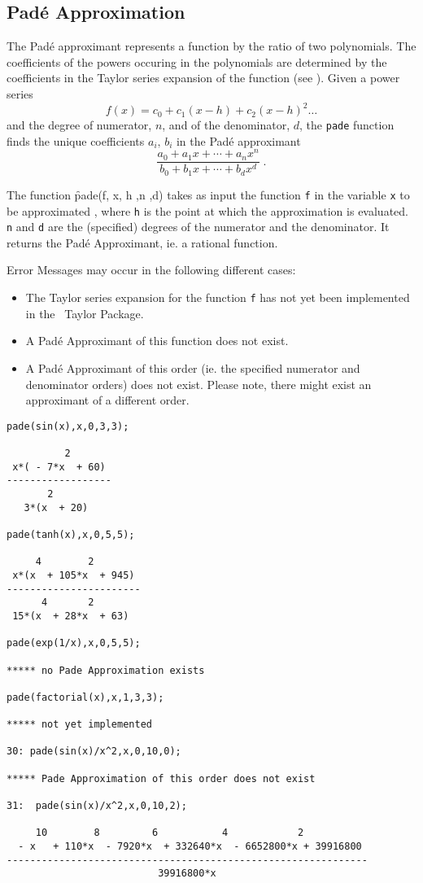 \subsection{Pad\'{e} Approximation}

The Pad\'{e} approximant represents a function by the ratio of two 
polynomials. The coefficients of the powers occuring in the polynomials 
are determined by the coefficients in the Taylor series
expansion of the function (see \cite{Baker:81a}). Given a power series
\[ f(x) = c_0 + c_1 (x-h) + c_2 (x-h)^2 \ldots \]
and the degree of numerator, $n$, and of the denominator, $d$,
the {\tt pade} function finds the unique coefficients 
$a_i,\, b_i$ in the Pad\'{e} approximant 
\[ \frac{a_0+a_1 x+ \cdots + a_n x^n}{b_0+b_1 x+ \cdots + b_d x^d} \; .\]

The function \f{pade(f, x, h ,n ,d)} takes as input the
function {\tt f} in the variable {\tt x} to be approximated , where
{\tt h} is the point at which the approximation is evaluated. {\tt n}
and {\tt d} are the (specified) degrees of the numerator and the denominator. 
It returns the Pad\'{e} Approximant, ie. a rational function. \par
Error Messages may occur in the following different cases:
\begin{itemize}
\item The Taylor series expansion for the function {\tt f} has not yet been
      implemented in the \REDUCE\ Taylor Package.
\item A Pad\'{e} Approximant of this function does not exist.
\item A Pad\'{e} Approximant of this order (ie. the specified numerator and
      denominator orders) does not exist. Please note, there might exist an 
      approximant of a different order.
\end{itemize}

\newpage
\begin{verbatim}
pade(sin(x),x,0,3,3);

          2
 x*( - 7*x  + 60)
------------------
       2
   3*(x  + 20)

pade(tanh(x),x,0,5,5);

     4        2
 x*(x  + 105*x  + 945)
-----------------------
      4       2
 15*(x  + 28*x  + 63)

pade(exp(1/x),x,0,5,5);

***** no Pade Approximation exists

pade(factorial(x),x,1,3,3);

***** not yet implemented

30: pade(sin(x)/x^2,x,0,10,0);

***** Pade Approximation of this order does not exist

31:  pade(sin(x)/x^2,x,0,10,2);

     10        8         6           4            2
  - x   + 110*x  - 7920*x  + 332640*x  - 6652800*x + 39916800
--------------------------------------------------------------
                          39916800*x

\end{verbatim}
